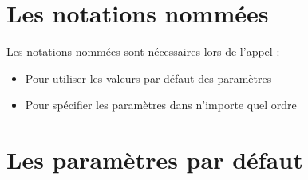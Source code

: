 \documentclass[10pt]{beamer}
\begin{document}
\section{Les notations nommées}

\begin{frame}{\secname}
    Les notations nommées sont nécessaires lors de l'appel :
    \begin{itemize}
        \item Pour utiliser les valeurs par défaut des paramètres
        \item Pour spécifier les paramètres dans n'importe quel ordre
    \end{itemize}
\end{frame}

\begin{frame}{\secname}
    
\end{frame}

\section{Les paramètres par défaut}

\begin{frame}{\secname}
    
\end{frame}


\end{document}
